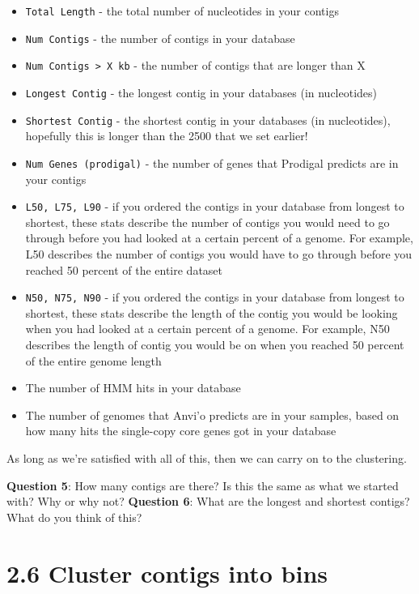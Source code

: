 \documentclass[
]{book}
\providecommand{\tightlist}{%
  \setlength{\itemsep}{0pt}\setlength{\parskip}{0pt}}
\begin{document}
\begin{itemize}
\tightlist
\item
  \texttt{Total\ Length} - the total number of nucleotides in your contigs
\item
  \texttt{Num\ Contigs} - the number of contigs in your database
\item
  \texttt{Num\ Contigs\ \textgreater{}\ X\ kb} - the number of contigs that are longer than X
\item
  \texttt{Longest\ Contig} - the longest contig in your databases (in nucleotides)
\item
  \texttt{Shortest\ Contig} - the shortest contig in your databases (in nucleotides), hopefully this is longer than the 2500 that we set earlier!
\item
  \texttt{Num\ Genes\ (prodigal)} - the number of genes that Prodigal predicts are in your contigs
\item
  \texttt{L50,\ L75,\ L90} - if you ordered the contigs in your database from longest to shortest, these stats describe the number of contigs you would need to go through before you had looked at a certain percent of a genome. For example, L50 describes the number of contigs you would have to go through before you reached 50 percent of the entire dataset
\item
  \texttt{N50,\ N75,\ N90} - if you ordered the contigs in your database from longest to shortest, these stats describe the length of the contig you would be looking when you had looked at a certain percent of a genome. For example, N50 describes the length of contig you would be on when you reached 50 percent of the entire genome length
\item
  The number of HMM hits in your database
\item
  The number of genomes that Anvi'o predicts are in your samples, based on how many hits the single-copy core genes got in your database
\end{itemize}

As long as we're satisfied with all of this, then we can carry on to the clustering.

\textbf{Question 5}: How many contigs are there? Is this the same as what we started with? Why or why not?
\textbf{Question 6}: What are the longest and shortest contigs? What do you think of this?

\section{2.6 Cluster contigs into bins}\label{cluster-contigs-into-bins}
\end{document}
